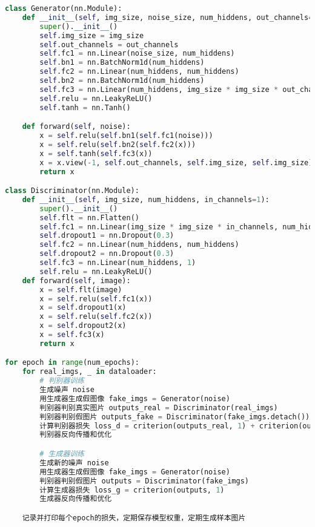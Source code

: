 \documentclass[12pt, a4paper]{article}
\begin{document}
\begin{lstlisting}[language=Python, caption=GAN 训练主循环示例]
class Generator(nn.Module):
    def __init__(self, img_size, noise_size, num_hiddens, out_channels=1):
        super().__init__()
        self.img_size = img_size
        self.out_channels = out_channels
        self.fc1 = nn.Linear(noise_size, num_hiddens)
        self.bn1 = nn.BatchNorm1d(num_hiddens)
        self.fc2 = nn.Linear(num_hiddens, num_hiddens)
        self.bn2 = nn.BatchNorm1d(num_hiddens)
        self.fc3 = nn.Linear(num_hiddens, img_size * img_size * out_channels)
        self.relu = nn.LeakyReLU()
        self.tanh = nn.Tanh()

    def forward(self, noise):
        x = self.relu(self.bn1(self.fc1(noise)))
        x = self.relu(self.bn2(self.fc2(x)))
        x = self.tanh(self.fc3(x))
        x = x.view(-1, self.out_channels, self.img_size, self.img_size)
        return x

class Discriminator(nn.Module):
    def __init__(self, img_size, num_hiddens, in_channels=1):
        super().__init__()
        self.flt = nn.Flatten()
        self.fc1 = nn.Linear(img_size * img_size * in_channels, num_hiddens)
        self.dropout1 = nn.Dropout(0.3)
        self.fc2 = nn.Linear(num_hiddens, num_hiddens)
        self.dropout2 = nn.Dropout(0.3)
        self.fc3 = nn.Linear(num_hiddens, 1)
        self.relu = nn.LeakyReLU()
    def forward(self, image):
        x = self.flt(image)
        x = self.relu(self.fc1(x))
        x = self.dropout1(x)
        x = self.relu(self.fc2(x))
        x = self.dropout2(x)
        x = self.fc3(x)
        return x

for epoch in range(num_epochs):
    for real_imgs, _ in dataloader:
        # 判别器训练
        生成噪声 noise
        用生成器生成假图像 fake_imgs = Generator(noise)
        判别器判别真实图片 outputs_real = Discriminator(real_imgs)
        判别器判别假图片 outputs_fake = Discriminator(fake_imgs.detach())
        计算判别器损失 loss_d = criterion(outputs_real, 1) + criterion(outputs_fake, 0)
        判别器反向传播和优化

        # 生成器训练
        生成新的噪声 noise
        用生成器生成假图像 fake_imgs = Generator(noise)
        判别器判别假图片 outputs = Discriminator(fake_imgs)
        计算生成器损失 loss_g = criterion(outputs, 1)
        生成器反向传播和优化

    记录并打印每个epoch的损失，定期保存模型权重，定期生成样本图片
\end{lstlisting}
\end{document}
